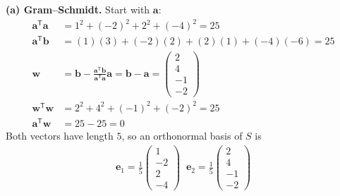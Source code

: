 \documentclass[11pt,a4paper]{article}
\begin{document}
\textbf{(a) Gram--Schmidt.} Start with $\mathbf a$:
\begin{align*}
\mathbf a^{\mathsf T}\mathbf a
&=1^2+(-2)^2+2^2+(-4)^2=25\\
\mathbf a^{\mathsf T}\mathbf b
&=(1)(3)+(-2)(2)+(2)(1)+(-4)(-6)=25\\
\mathbf w
&=\mathbf b-\frac{\mathbf a^{\mathsf T}\mathbf b}{\mathbf a^{\mathsf T}\mathbf a}\mathbf a
=\mathbf b-\mathbf a
=\begin{pmatrix}2\\4\\-1\\-2\end{pmatrix}\\
\mathbf w^{\mathsf T}\mathbf w
&=2^2+4^2+(-1)^2+(-2)^2=25\\
\mathbf a^{\mathsf T}\mathbf w
&=25-25=0
\end{align*}
Both vectors have length $5$, so an orthonormal basis of $S$ is
\begin{align*}
\boxed{\displaystyle
\mathbf e_1=\frac15\begin{pmatrix}1\\-2\\2\\-4\end{pmatrix}
\;\;
\mathbf e_2=\frac15\begin{pmatrix}2\\4\\-1\\-2\end{pmatrix}}
\end{align*}
\end{document}
